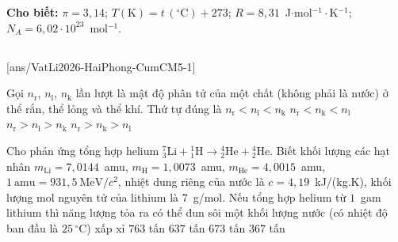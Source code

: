 \def\CheDo{solcolor}%
\def\tenchuong{Cụm chuyên môn số 5, Hải Phòng}
\def\thuonghieu{VẬT LÍ 12 -- Eduzy.com.vn}
\def\TachCauDS{1}
\def\TachCauLG{1}




	\noindent\textbf{Cho biết:} $\pi=3{,}14$; $T(\text{K})=t\,(^\circ\text{C})+273$; $R=8{,}31$~J$\cdot$mol$^{-1}\cdot$K$^{-1}$; $N_A=6{,}02\cdot 10^{23}$~mol$^{-1}$.

	\noindent
	\subsection*{}
	\setcounter{ex}{0}
	[ans/VatLi2026-HaiPhong-CumCM5-1]

	\begin{ex}%
		Gọi $n_\text{r}$, $n_\text{l}$, $n_\text{k}$ lần lượt là mật độ phân tử của một chất (không phải là nước) ở thể rắn, thể lỏng và thể khí. Thứ tự đúng là
		\choice
		{$n_\text{r}<n_\text{l}<n_\text{k}$}
		{$n_\text{r}<n_\text{k}<n_\text{l}$}
		{\True $n_\text{r}>n_\text{l}>n_\text{k}$}
		{$n_\text{r}>n_\text{k}>n_\text{l}$}
	\end{ex}

	\begin{ex}%
		Cho phản ứng tổng hợp helium ${}^7_3\text{Li}+{}^1_1\text{H}\to{}^4_2\text{He}+{}^4_2\text{He}$. Biết khối lượng các hạt nhân $m_\text{Li}=7{,}0144$~amu, $m_\text{H}=1{,}0073$~amu, $m_\text{He}=4{,}0015$~amu, $1~\text{amu}=931{,}5~\text{MeV}/c^2$, nhiệt dung riêng của nước là $c=4{,}19$~kJ/(kg.K), khối lượng mol nguyên tử của lithium là $7$~g/mol. Nếu tổng hợp helium từ $1$~gam lithium thì năng lượng tỏa ra có thể đun sôi một khối lượng nước (có nhiệt độ ban đầu là $25\,^\circ\text{C}$) xấp xỉ
		\choice
		{\True $763$ tấn}
		{$637$ tấn}
		{$673$ tấn}
		{$367$ tấn}
	\end{ex}

